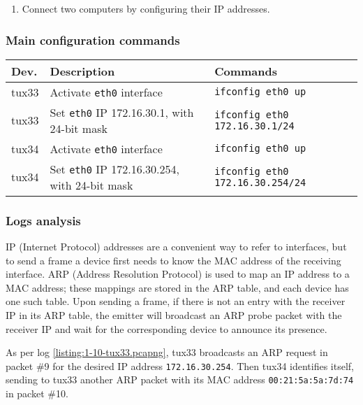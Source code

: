 \documentclass[a4paper, 11pt]{report}
\begin{document}
\begin{enumerate}
    \item Connect two computers by configuring their IP addresses.
\end{enumerate}

\subsubsection{Main configuration commands} \label{sec:Com1}

\begin{tabular}{l | p{75mm} | l}
    \textbf{Dev.} & \textbf{Description}                                  & \textbf{Commands}                       \\ \hline
    tux33         & Activate \texttt{eth0} interface                     & \texttt{ifconfig eth0 up}               \\
    tux33         & Set \texttt{eth0} IP 172.16.30.1, with 24-bit mask   & \texttt{ifconfig eth0 172.16.30.1/24}   \\ \hline
    tux34         & Activate \texttt{eth0} interface                     & \texttt{ifconfig eth0 up}               \\
    tux34         & Set \texttt{eth0} IP 172.16.30.254, with 24-bit mask & \texttt{ifconfig eth0 172.16.30.254/24} \\
\end{tabular}

\subsubsection{Logs analysis} \label{sec:Log1}

IP (Internet Protocol) addresses are a convenient way to refer to interfaces, but to send a frame a device first needs to know the MAC address of the receiving interface.
ARP (Address Resolution Protocol) is used to map an IP address to a MAC address; these mappings are stored in the ARP table, and each device has one such table.
Upon sending a frame, if there is not an entry with the receiver IP in its ARP table, the emitter will broadcast an ARP probe packet with the receiver IP and wait for the corresponding device to announce its presence.

As per log \ref{listing:1-10-tux33.pcapng}, tux33 broadcasts an ARP request in packet \#9 for the desired IP address \texttt{172.16.30.254}.
Then tux34 identifies itself, sending to tux33 another ARP packet with its MAC address \texttt{00:21:5a:5a:7d:74} in packet \#10.
\end{document}
